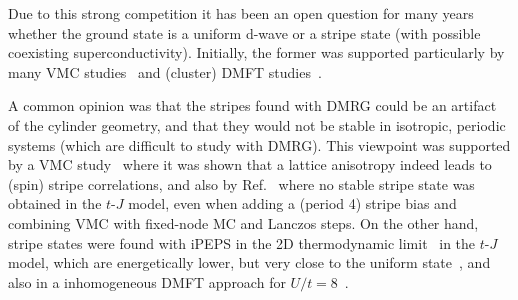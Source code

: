 \documentclass{ar-1col}
\begin{document}
Due to this strong competition it has been an open question for many years whether the ground state is a uniform d-wave or a stripe state (with possible coexisting superconductivity). Initially, the former was supported particularly by many VMC studies~\cite{Yokoyama88,Gros88,Giamarchi91,Sorella02,Eichenberger07,Misawa14,Tocchio16} and (cluster) DMFT studies~\cite{Lichtenstein00,Halboth00B,Maier05B,Capone06}.\begin{marginnote}
\end{marginnote}A common opinion was that the stripes found with DMRG could be an artifact of the cylinder geometry, and that they would not be stable in isotropic, periodic systems (which are difficult to study with DMRG). This viewpoint was supported by a VMC study~\cite{Becca01} where it was shown that a lattice anisotropy indeed leads to (spin) stripe correlations, and also by Ref.~\cite{Hu12} where no stable stripe state was obtained in the $t$-$J$ model, even when adding a (period 4) stripe bias and combining VMC with fixed-node MC and Lanczos steps. On the other hand, stripe states were found with iPEPS in the 2D thermodynamic limit~\cite{Corboz11} in the $t$-$J$ model, which are energetically lower, but very close to the uniform state~\cite{Corboz14}, and also in a inhomogeneous DMFT approach for $U/t=8$~\cite{Peters14}.
\begin{marginnote}
\end{marginnote}
\end{document}
